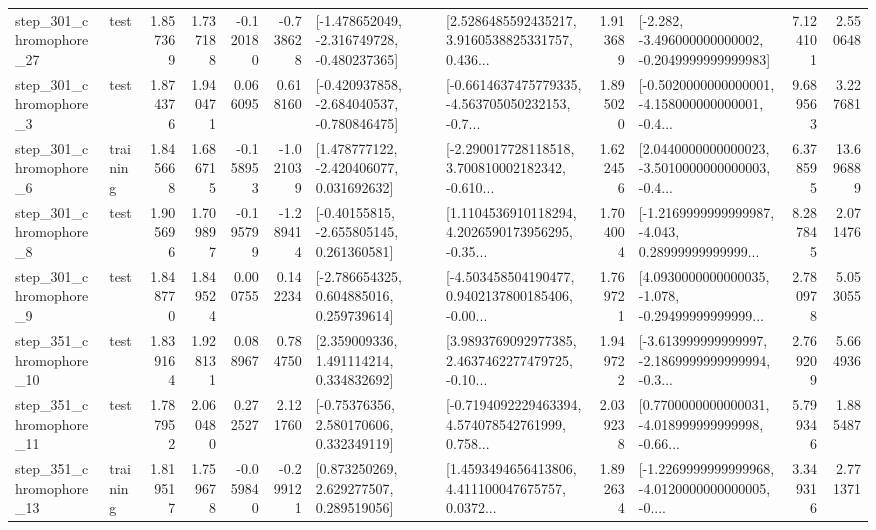 \begin{tabular}{llrrrrllrlrr}
  step\_301\_chromophore\_27 &      test &      1.857369 &    1.737188 &     -0.120180 & -0.738628 &  [-1.478652049, -2.316749728, -0.480237365] &  [2.5286485592435217, 3.9160538825331757, 0.436... &       1.913689 &  [-2.282, -3.496000000000002, -0.2049999999999983] &            7.124101 &          2.550648 \\
   step\_301\_chromophore\_3 &      test &      1.874376 &    1.940471 &      0.066095 &  0.618160 &  [-0.420937858, -2.684040537, -0.780846475] &  [-0.6614637475779335, -4.563705050232153, -0.7... &       1.895020 &  [-0.5020000000000001, -4.158000000000001, -0.4... &            9.689563 &          3.227681 \\
   step\_301\_chromophore\_6 &  training &      1.845668 &    1.686715 &     -0.158953 & -1.021039 &    [1.478777122, -2.420406077, 0.031692632] &  [-2.290017728118518, 3.700810002182342, -0.610... &       1.622456 &  [2.0440000000000023, -3.5010000000000003, -0.4... &            6.378595 &         13.696889 \\
   step\_301\_chromophore\_8 &      test &      1.905696 &    1.709897 &     -0.195799 & -1.289414 &    [-0.40155815, -2.655805145, 0.261360581] &  [1.1104536910118294, 4.2026590173956295, -0.35... &       1.704004 &  [-1.2169999999999987, -4.043, 0.28999999999999... &            8.287845 &          2.071476 \\
   step\_301\_chromophore\_9 &      test &      1.848770 &    1.849524 &      0.000755 &  0.142234 &    [-2.786654325, 0.604885016, 0.259739614] &  [-4.503458504190477, 0.9402137800185406, -0.00... &       1.769721 &  [4.0930000000000035, -1.078, -0.29499999999999... &            2.780978 &          5.053055 \\
  step\_351\_chromophore\_10 &      test &      1.839164 &    1.928131 &      0.088967 &  0.784750 &     [2.359009336, 1.491114214, 0.334832692] &  [3.9893769092977385, 2.4637462277479725, -0.10... &       1.949722 &  [-3.613999999999997, -2.1869999999999994, -0.3... &            2.769209 &          5.664936 \\
  step\_351\_chromophore\_11 &      test &      1.787952 &    2.060480 &      0.272527 &  2.121760 &     [-0.75376356, 2.580170606, 0.332349119] &  [-0.7194092229463394, 4.574078542761999, 0.758... &       2.039238 &  [0.7700000000000031, -4.018999999999998, -0.66... &            5.799346 &          1.885487 \\
  step\_351\_chromophore\_13 &  training &      1.819517 &    1.759678 &     -0.059840 & -0.299121 &     [0.873250269, 2.629277507, 0.289519056] &  [1.4593494656413806, 4.411100047675757, 0.0372... &       1.892634 &  [-1.2269999999999968, -4.0120000000000005, -0.... &            3.349316 &          2.771371 \\

\end{tabular}
